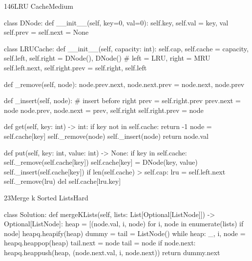 \begin{problem}{146}{LRU Cache}{Medium}
\begin{code}
class DNode:
    def __init__(self, key=0, val=0):
        self.key, self.val = key, val
        self.prev = self.next = None

class LRUCache:
    def __init__(self, capacity: int):
        self.cap, self.cache = capacity, {}
        self.left, self.right = DNode(), DNode()      # left = LRU, right = MRU
        self.left.next, self.right.prev = self.right, self.left

    def _remove(self, node):
        node.prev.next, node.next.prev = node.next, node.prev

    def _insert(self, node):                         # insert before right
        prev = self.right.prev
        prev.next = node
        node.prev, node.next = prev, self.right
        self.right.prev = node

    def get(self, key: int) -> int:
        if key not in self.cache:
            return -1
        node = self.cache[key]
        self._remove(node)
        self._insert(node)
        return node.val

    def put(self, key: int, value: int) -> None:
        if key in self.cache:
            self._remove(self.cache[key])
        self.cache[key] = DNode(key, value)
        self._insert(self.cache[key])
        if len(self.cache) > self.cap:
            lru = self.left.next
            self._remove(lru)
            del self.cache[lru.key]
\end{code}
\end{problem}

\begin{problem}{23}{Merge k Sorted Lists}{Hard}
\begin{code}
class Solution:
    def mergeKLists(self, lists: List[Optional[ListNode]]) -> Optional[ListNode]:
        heap = [(node.val, i, node) for i, node in enumerate(lists) if node]
        heapq.heapify(heap)
        dummy = tail = ListNode()
        while heap:
            _, i, node = heapq.heappop(heap)
            tail.next = node
            tail = node
            if node.next:
                heapq.heappush(heap, (node.next.val, i, node.next))
        return dummy.next
\end{code}
\end{problem}

